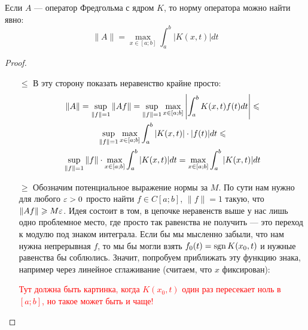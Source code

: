 \begin{proposition}
	Если $A$ --- оператор Фредгольма с ядром $K$, то норму оператора можно найти явно:
	\[
		\|A\| = \max_{x \in [a; b]} \int_a^b |K(x, t)|dt
	\]
\end{proposition}

\begin{proof}~
	\begin{itemize}
		\item[$\le$] В эту сторону показать неравенство крайне просто:
		\begin{multline*}
			\|A\| = \sup_{\|f\| = 1} \|Af\| = \sup_{\|f\| = 1} \max_{x \in [a; b]} \left|\int_a^b K(x, t)f(t)dt\right| \leqslant
			\\
			\sup_{\|f\| = 1} \max_{x \in [a; b]} \int_a^b |K(x, t)| \cdot |f(t)|dt \leqslant
			\\
			\sup_{\|f\| = 1} \|f\| \cdot \max_{x \in [a; b]} \int_a^b |K(x, t)|dt = \max_{x \in [a; b]} \int_a^b |K(x, t)|dt
		\end{multline*}
		
		\item[$\ge$] Обозначим потенциальное выражение нормы за $M$. По сути нам нужно для любого $\varepsilon > 0$ просто найти $f \in C[a; b]$, $\|f\| = 1$ такую, что $\|Af\| \geqslant M\varepsilon$. Идея состоит в том, в цепочке неравенств выше у нас лишь одно проблемное место, где просто так равенства не получить --- это переход к модулю под знаком интеграла. Если бы мы мысленно забыли, что нам нужна непрерывная $f$, то мы бы могли взять $f_0(t) = \operatorname{sgn} K(x_0, t)$ и нужные равенства бы соблюлись. Значит, попробуем приближать эту функцию знака, например через линейное сглаживание (считаем, что $x$ фиксирован):
		
		\textcolor{red}{Тут должна быть картинка, когда $K(x_0, t)$ один раз пересекает ноль в $[a; b]$, но такое может быть и чаще!}
		

\end{itemize}
\end{proof}
